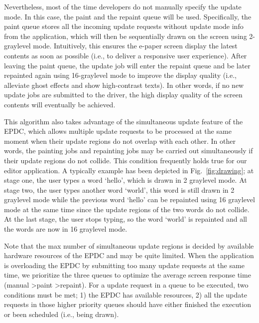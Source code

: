 \documentclass[]{sigchi}
\begin{document}

Nevertheless, most of the time developers do not manually specify the update mode. In this case, the paint and the repaint queue will be used. Specifically, 
the paint queue stores all the incoming update requests without update mode info from the application, which will then be sequentially drawn on the screen using 2-graylevel mode. Intuitively, this ensures the e-paper screen  display the latest contents as soon as possible (i.e., to deliver a responsive user experience).
After leaving the paint queue, the update job will enter the repaint queue and be later repainted again using 16-graylevel mode to improve the display quality (i.e., alleviate ghost effects and show high-contrast texts). In other words, if no new update jobs are submitted to the driver, the high display quality of the screen contents will eventually be achieved. 

This algorithm also takes advantage of the simultaneous update feature of the EPDC, which allows multiple update requests to be processed at the same moment when their update regions do not overlap with each other. In other words, the painting jobs and repainting jobs may be carried out simultaneously if their update regions do not collide. This condition frequently holds true for our editor application. A typically example has been depicted in Fig.~\ref{fig:drawing}; at stage one, the user types a word `hello', which is drawn in 2 graylevel mode. At stage two, the user types another word `world', this word is still drawn in 2 graylevel mode while the previous word `hello' can be repainted using 16 graylevel mode at the same time since the update regions of the two words do not collide. At the last stage, the user stops typing, so the word `world' is repainted and all the words are now in 16 graylevel mode.

Note that the max number of simultaneous update regions is decided by available hardware resources of the EPDC and may be quite limited. When the application is overloading the EPDC by submitting too many update requests at the same time, we prioritize the three queues to optimize the average screen response time (manual \textgreater paint \textgreater repaint).
For a update request in a queue to be executed, two conditions must be met; 1) the EPDC has available resources, 2) all the update requests in those higher priority queues should have either finished the execution or been scheduled (i.e., being drawn).
\end{document}
